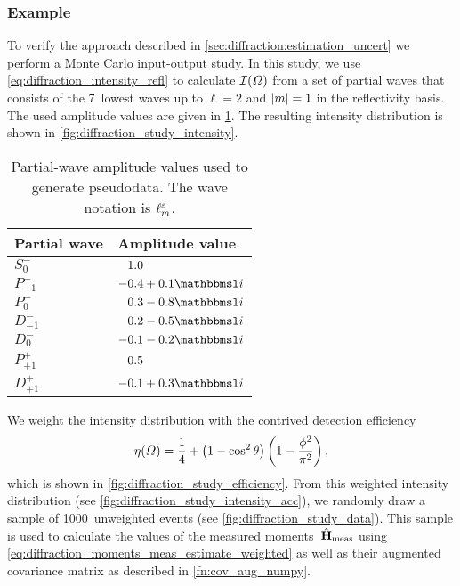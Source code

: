 \subsubsection{Example}%
\label{sec:diffraction:example}

To verify the approach described in
\cref{sec:diffraction:estimation_uncert} we perform a Monte Carlo
input-output study.  In this study, we use
\cref{eq:diffraction_intensity_refl} to calculate
$\mathcal{I}(\Omega)$ from a set of partial waves that consists of the
7~lowest waves up to $\ell = 2$ and $\vert{m}\vert = 1$ in the reflectivity
basis.  The used amplitude values are given in
\cref{tab:diffraction_study_waveset}.  The resulting intensity
distribution is shown in \cref{fig:diffraction_study_intensity}.

\begin{table}[tbp]
  \centering%
  \renewcommand{\arraystretch}{1.2}%
  \caption{Partial-wave amplitude values used to generate pseudodata.
  The wave notation is $\ell_m^\varepsilon$.}%
  \label{tab:diffraction_study_waveset}%
  \vspace*{1ex}%
  \begin{tabular}{ll}
    \toprule
    \textbf{Partial wave} &
    \textbf{Amplitude value} \\
    \midrule
    $S_0^-$    & $\hphantom{-}1.0$ \\
    $P_{-1}^-$ & $-0.4 + 0.1 \imag$ \\
    $P_0^-$    & $\hphantom{-}0.3 - 0.8 \imag$ \\
    $D_{-1}^-$ & $\hphantom{-}0.2 - 0.5 \imag$ \\
    $D_0^-$    & $-0.1 - 0.2 \imag$ \\
    \midrule
    $P_{+1}^+$ & $\hphantom{-}0.5$ \\
    $D_{+1}^+$ & $-0.1 + 0.3 \imag$ \\
    \bottomrule
  \end{tabular}
\end{table}

We weight the intensity distribution with the contrived detection
efficiency
\begin{equation}
  \label{eq:diffraction_study_acc1}
  \eta(\Omega)
  = \frac{1}{4} + \rBrk[1]{1 - \cos^2 \theta} \rBrk[3]{1 - \frac{\phi^2}{\pi^2}},
\end{equation}
which is shown in \cref{fig:diffraction_study_efficiency}.  From this
weighted intensity distribution (see
\cref{fig:diffraction_study_intensity_acc}), we randomly draw a sample
of \num{1000}~unweighted events (see \cref{fig:diffraction_study_data}).  This
sample is used to calculate the values of the measured
moments~$\hat{\bm{\mathrm{H}}}_\text{meas}$ using
\cref{eq:diffraction_moments_meas_estimate_weighted} as well as their augmented
covariance matrix as described in \cref{fn:cov_aug_numpy}.

